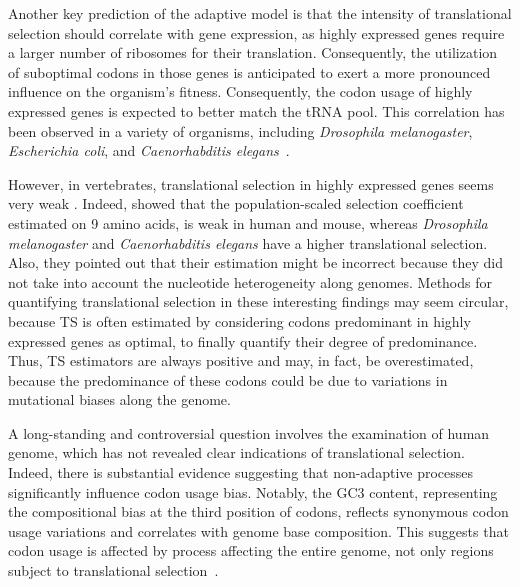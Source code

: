 Another key prediction of the adaptive model is that the intensity of \gls{translational selection} should correlate with gene expression, as highly expressed genes require a larger number of ribosomes for their translation. Consequently, the utilization of suboptimal codons in those genes is anticipated to exert a more pronounced influence on the organism's fitness. Consequently, the codon usage of highly expressed genes is expected to better match the tRNA pool. This correlation has been observed in a variety of organisms, including \textit{Drosophila melanogaster}, \textit{Escherichia coli}, and \textit{Caenorhabditis elegans}~\citep{ikemura_correlation_1981, sharp_codon_1988, percudani_restricted_2001, duret_expression_1999, duret_trna_2000}.

However, in vertebrates, \gls{translational selection} in highly expressed genes seems very weak \citep{dos_reis_estimating_2009, doherty_translational_2013}. Indeed, \citet{dos_reis_estimating_2009} showed that the population-scaled selection coefficient estimated on 9 amino acids, is weak in human and mouse, whereas \textit{Drosophila melanogaster} and \textit{Caenorhabditis elegans} have a higher \gls{translational selection}. Also, they pointed out that their estimation might be incorrect because they did not take into account the nucleotide heterogeneity along genomes. Methods for quantifying \gls{translational selection} in these interesting findings may seem circular, because \acrshort{TS} is often estimated by considering codons predominant in highly expressed genes as optimal, to finally quantify their degree of predominance. Thus, \acrshort{TS} estimators are always positive and may, in fact, be overestimated, because the predominance of these codons could be due to variations in mutational biases along the genome.

A long-standing and controversial question involves the examination of human genome, which has not revealed clear indications of \gls{translational selection}. Indeed, there is substantial evidence suggesting that non-adaptive processes significantly influence codon usage bias. Notably, the \acrshort{GC3} content, representing the compositional bias at the third position of codons, reflects synonymous codon usage variations and correlates with genome base composition. This suggests that codon usage is affected by process affecting the entire genome, not only regions subject to \gls{translational selection}~\citep{mouchiroud_compositional_1988, mouchiroud_distribution_1991, kanaya_codon_2001, chen_codon_2004, clay_gc3_2011}.

